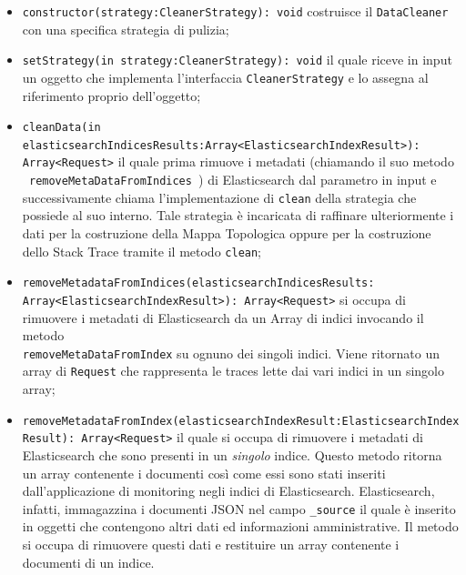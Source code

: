 \begin{itemize} 
	\item  \texttt{constructor(strategy:CleanerStrategy): void} costruisce il \texttt{DataCleaner} con una specifica strategia di pulizia;
	\item \texttt{setStrategy(in strategy:CleanerStrategy): void} il quale riceve in input un oggetto che implementa l'interfaccia \texttt{CleanerStrategy} e lo assegna al riferimento proprio dell'oggetto;
	
	\item \texttt{cleanData(in elasticsearchIndicesResults:Array<ElasticsearchIndexResult>): Array<Request>} il quale prima rimuove i metadati (chiamando il suo metodo \\ \texttt{ removeMetaDataFromIndices }) di Elasticsearch dal parametro in input e successivamente chiama l'implementazione di \texttt{clean} della strategia che possiede al suo interno.  Tale strategia è incaricata di raffinare ulteriormente i dati per la costruzione della Mappa Topologica oppure per la costruzione dello Stack Trace tramite il metodo \texttt{clean};
	
	\item \texttt{removeMetadataFromIndices(elasticsearchIndicesResults: \\Array<ElasticsearchIndexResult>): Array<Request>}  si occupa di rimuovere i metadati di Elasticsearch da un Array di indici invocando il metodo\\ \texttt{removeMetaDataFromIndex} su ognuno dei singoli indici. Viene ritornato un array di \texttt{Request} che rappresenta le traces lette dai vari indici in un singolo array;
	
	\item \texttt{removeMetadataFromIndex(elasticsearchIndexResult:ElasticsearchIndexResult): Array<Request>} il quale si occupa di rimuovere i metadati di Elasticsearch che sono presenti in un \emph{singolo} indice. Questo metodo ritorna un array contenente i documenti  così come essi sono stati inseriti dall'applicazione di monitoring negli indici di Elasticsearch. Elasticsearch, infatti, immagazzina i documenti JSON nel campo \texttt{\_source} il quale è inserito in oggetti che contengono altri dati ed informazioni amministrative. Il metodo si occupa di rimuovere questi dati e restituire un array contenente i documenti di un indice.
\end{itemize}


